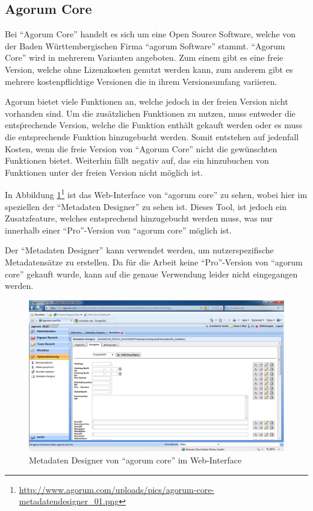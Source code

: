 \subsection{Agorum Core} \label{Agorum Core}
Bei "`Agorum Core"' handelt es sich um eine Open Source Software, welche von der Baden W\"urttembergischen Firma "`agorum Software"' stammt. "`Agorum Core"' wird in mehrerem Varianten angeboten. Zum einem gibt es eine freie Version, welche ohne Lizenzkosten genutzt werden kann, zum anderem gibt es mehrere kostenpflichtige Versionen die in ihrem Versionsumfang variieren. \cite{agorum_home} 

Agorum bietet viele Funktionen an, welche jedoch in der freien Version nicht vorhanden sind. Um die zus\"atzlichen Funktionen zu nutzen, muss entweder die ents\"prechende Version, welche die Funktion enth\"alt gekauft werden oder es muss die entsprechende Funktion hinzugebucht werden.
Somit entstehen auf jedenfall Kosten, wenn die freie Version von "`Agorum Core"' nicht die gew\"unschten Funktionen bietet. Weiterhin f\"allt negativ auf, das ein hinzubuchen von Funktionen unter der freien Version nicht m\"oglich ist. \cite{agorum_preise} \cite{Eval_DMS_Bachelor}

In Abbildung \ref{metadatendesigner agorum}\footnote{\url{http://www.agorum.com/uploads/pics/agorum-core-metadatendesigner_01.png}} ist das Web-Interface von "`agorum core"' zu sehen, wobei hier im speziellen der "`Metadaten Designer"' zu sehen ist. Dieses Tool, ist jedoch ein Zusatzfeature, welches entsprechend hinzugebucht werden muss, was nur innerhalb einer "`Pro"'-Version von "`agorum core"' m\"oglich ist. \cite{agorum_metadesigner_bild}

Der "`Metadaten Designer"' kann verwendet werden, um nutzerspezifische Metadatens\"atze zu erstellen.  Da f\"ur die Arbeit keine "`Pro"'-Version von "`agorum core"' gekauft wurde, kann auf die genaue Verwendung leider nicht eingegangen werden. \cite{agorum_metadaten_designer_video}

\begin{figure}[!ht]
\centering
\includegraphics[width=16cm]{Bilder/agorum-core-metadatendesigner.png}
\caption{Metadaten Designer von "`agorum core"' im Web-Interface}
\label{metadatendesigner agorum}
\centering
\end{figure}

